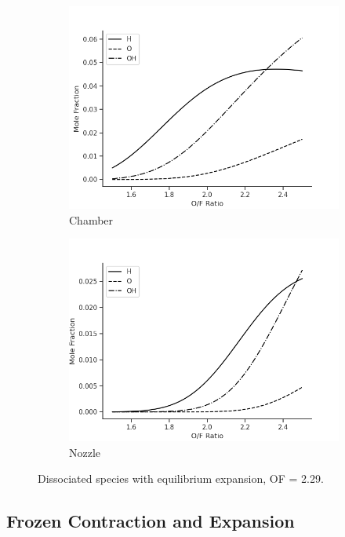 \documentclass[11pt]{article}
\begin{document}
\begin{figure}[H]
  \centering
  \begin{subfigure}{.5\textwidth}
    \centering
    \includegraphics[width=\linewidth]{dissociated-chamber.png}
    \caption{Chamber}
  \end{subfigure}%
  \begin{subfigure}{.5\textwidth}
    \centering
    \includegraphics[width=\linewidth]{dissociated-nozzle.png}
    \caption{Nozzle}
  \end{subfigure}
  \caption{Dissociated species with equilibrium expansion, OF = 2.29.}
  \label{fig:dissociated}
\end{figure}

\subsection{Frozen Contraction and Expansion}
\end{document}
